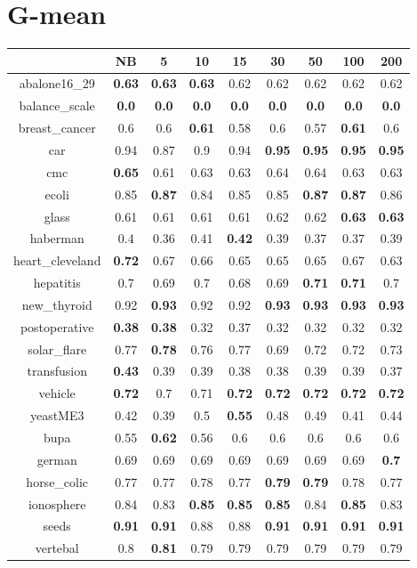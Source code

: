 \documentclass{article}%
\begin{document}
%
\section*{G{-}mean}%
\begin{tabular}{c|cccccccc}%
\hline%
&NB&5&10&15&30&50&100&200\\%
\hline%
abalone16\_29&\textbf{0.63}&\textbf{0.63}&\textbf{0.63}&0.62&0.62&0.62&0.62&0.62\\%
\hline%
balance\_scale&\textbf{0.0}&\textbf{0.0}&\textbf{0.0}&\textbf{0.0}&\textbf{0.0}&\textbf{0.0}&\textbf{0.0}&\textbf{0.0}\\%
\hline%
breast\_cancer&0.6&0.6&\textbf{0.61}&0.58&0.6&0.57&\textbf{0.61}&0.6\\%
\hline%
car&0.94&0.87&0.9&0.94&\textbf{0.95}&\textbf{0.95}&\textbf{0.95}&\textbf{0.95}\\%
\hline%
cmc&\textbf{0.65}&0.61&0.63&0.63&0.64&0.64&0.63&0.63\\%
\hline%
ecoli&0.85&\textbf{0.87}&0.84&0.85&0.85&\textbf{0.87}&\textbf{0.87}&0.86\\%
\hline%
glass&0.61&0.61&0.61&0.61&0.62&0.62&\textbf{0.63}&\textbf{0.63}\\%
\hline%
haberman&0.4&0.36&0.41&\textbf{0.42}&0.39&0.37&0.37&0.39\\%
\hline%
heart\_cleveland&\textbf{0.72}&0.67&0.66&0.65&0.65&0.65&0.67&0.63\\%
\hline%
hepatitis&0.7&0.69&0.7&0.68&0.69&\textbf{0.71}&\textbf{0.71}&0.7\\%
\hline%
new\_thyroid&0.92&\textbf{0.93}&0.92&0.92&\textbf{0.93}&\textbf{0.93}&\textbf{0.93}&\textbf{0.93}\\%
\hline%
postoperative&\textbf{0.38}&\textbf{0.38}&0.32&0.37&0.32&0.32&0.32&0.32\\%
\hline%
solar\_flare&0.77&\textbf{0.78}&0.76&0.77&0.69&0.72&0.72&0.73\\%
\hline%
transfusion&\textbf{0.43}&0.39&0.39&0.38&0.38&0.39&0.39&0.37\\%
\hline%
vehicle&\textbf{0.72}&0.7&0.71&\textbf{0.72}&\textbf{0.72}&\textbf{0.72}&\textbf{0.72}&\textbf{0.72}\\%
\hline%
yeastME3&0.42&0.39&0.5&\textbf{0.55}&0.48&0.49&0.41&0.44\\%
\hline%
bupa&0.55&\textbf{0.62}&0.56&0.6&0.6&0.6&0.6&0.6\\%
\hline%
german&0.69&0.69&0.69&0.69&0.69&0.69&0.69&\textbf{0.7}\\%
\hline%
horse\_colic&0.77&0.77&0.78&0.77&\textbf{0.79}&\textbf{0.79}&0.78&0.77\\%
\hline%
ionosphere&0.84&0.83&\textbf{0.85}&\textbf{0.85}&\textbf{0.85}&0.84&\textbf{0.85}&0.83\\%
\hline%
seeds&\textbf{0.91}&\textbf{0.91}&0.88&0.88&\textbf{0.91}&\textbf{0.91}&\textbf{0.91}&\textbf{0.91}\\%
\hline%
vertebal&0.8&\textbf{0.81}&0.79&0.79&0.79&0.79&0.79&0.79\\%
\hline%
\end{tabular}

%
\end{document}
